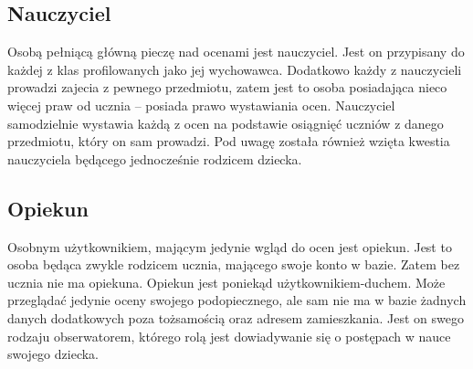 \documentclass[12pt, titlepage]{article}
\begin{document}
\subsection{Nauczyciel}

Osobą pełniącą główną pieczę nad ocenami jest nauczyciel. Jest on przypisany do każdej z klas profilowanych jako jej wychowawca. Dodatkowo każdy z nauczycieli prowadzi zajecia z pewnego przedmiotu, zatem jest to osoba posiadająca nieco więcej praw od ucznia – posiada prawo wystawiania ocen. Nauczyciel samodzielnie wystawia każdą z ocen na podstawie osiągnięć uczniów z danego przedmiotu, który on sam prowadzi. Pod uwagę została również wzięta kwestia nauczyciela będącego jednocześnie rodzicem dziecka.

\subsection{Opiekun}

Osobnym użytkownikiem, mającym jedynie wgląd do ocen jest opiekun. Jest to osoba będąca zwykle rodzicem ucznia, mającego swoje konto w bazie. Zatem bez ucznia nie ma opiekuna. Opiekun jest poniekąd użytkownikiem-duchem. Może przeglądać jedynie oceny swojego podopiecznego, ale sam nie ma w bazie żadnych danych dodatkowych poza tożsamością oraz adresem zamieszkania. Jest on swego rodzaju obserwatorem, którego rolą jest dowiadywanie się o postępach w nauce swojego dziecka. 
\end{document}

